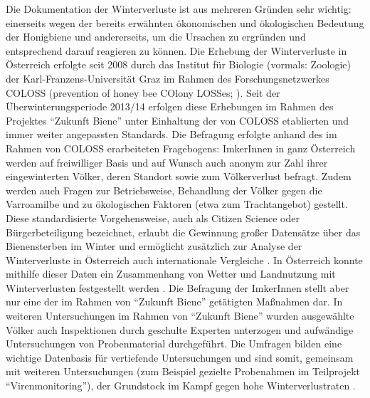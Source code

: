 \newline
Die Dokumentation der Winterverluste ist aus mehreren Gründen sehr wichtig: einerseits wegen der bereits erwähnten ökonomischen und ökologischen Bedeutung der Honigbiene und andererseits, um die Ursachen zu ergründen und entsprechend darauf reagieren zu können. Die Erhebung der Winterverluste in Österreich erfolgte seit 2008 durch das Institut für Biologie (vormals: Zoologie) der Karl-Franzens-Universität Graz im Rahmen des Forschungsnetzwerkes COLOSS (prevention of honey bee COlony LOSSes; \cite{brodschneider2010,brodschneider2013}). Seit der Überwinterungsperiode 2013/14 erfolgen diese Erhebungen im Rahmen des Projektes \enquote{Zukunft Biene} unter Einhaltung der von COLOSS etablierten und immer weiter angepassten Standards. Die Befragung erfolgte anhand des im Rahmen von COLOSS erarbeiteten Fragebogens: ImkerInnen in ganz Österreich werden auf freiwilliger Basis und auf Wunsch auch anonym zur Zahl ihrer eingewinterten Völker, deren Standort sowie zum Völkerverlust befragt. Zudem werden auch Fragen zur Betriebsweise, Behandlung der Völker gegen die Varroamilbe und zu ökologischen Faktoren (etwa zum Trachtangebot) gestellt. Diese standardisierte Vorgehensweise, auch als Citizen Science oder Bürgerbeteiligung bezeichnet, erlaubt die Gewinnung großer Datensätze über das Bienensterben im Winter und ermöglicht zusätzlich zur Analyse der Winterverluste in Österreich auch internationale Vergleiche \citep{brodschneider2016, brodschneider2018,brodschneider2019}. In Österreich konnte mithilfe dieser Daten ein Zusammenhang von Wetter und Landnutzung mit Winterverlusten festgestellt werden \citep{switanek2017, kuchling2018}. Die Befragung der ImkerInnen stellt aber nur eine der im Rahmen von \enquote{Zukunft Biene} getätigten Maßnahmen dar. In weiteren Untersuchungen im Rahmen von \enquote{Zukunft Biene} wurden ausgewählte Völker auch Inspektionen durch geschulte Experten unterzogen und aufwändige Untersuchungen von Probenmaterial durchgeführt. Die Umfragen bilden eine wichtige Datenbasis für vertiefende Untersuchungen und sind somit, gemeinsam mit weiteren Untersuchungen (zum Beispiel gezielte Probenahmen im Teilprojekt \enquote{Virenmonitoring}), der Grundstock im Kampf gegen hohe Winterverlustraten \citep{vanderzee2015}.